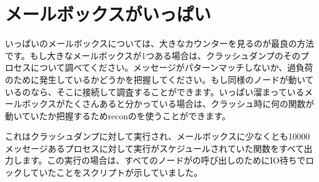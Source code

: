 \section{メールボックスがいっぱい}
\label{sec:crash-full-mailboxes}

いっぱいのメールボックスについては、大きなカウンターを見るのが最良の方法です。もし大きなメールボックスが1つある場合は、クラッシュダンプのそのプロセスについて調べてください。メッセージがパターンマッチしないか、過負荷のために発生しているかどうかを把握してください。もし同様のノードが動いているのなら、そこに接続して調査することができます。いっぱい溜まっているメールボックスがたくさんあると分かっている場合は、クラッシュ時に何の関数が動いていたか把握するためreconのを使うことができます。


これはクラッシュダンプに対して実行され、メールボックスに少なくとも10000メッセージあるプロセスに対して実行がスケジュールされていた関数をすべて出力します。この実行の場合は、すべてのノードがの呼び出しのためにIO待ちでロックしていたことをスクリプトが示していました。

